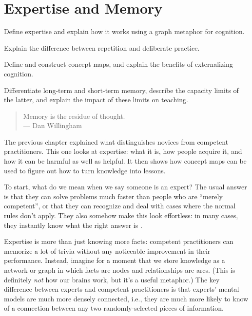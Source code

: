 \chapter{Expertise and Memory}\label{s:memory}

\begin{objectives}

\item Define expertise and explain how it works using a graph metaphor
  for cognition.

\item Explain the difference between repetition and deliberate
  practice.

\item Define and construct concept maps, and explain the benefits of
  externalizing cognition.

\item Differentiate long-term and short-term memory, describe the
  capacity limits of the latter, and explain the impact of these
  limits on teaching.

\end{objectives}

\begin{quote}

  Memory is the residue of thought. \\
  --- Dan Willingham

\end{quote}

The previous chapter explained what distinguishes novices from
competent practitioners. This one looks at expertise: what it is, how
people acquire it, and how it can be harmful as well as helpful.  It
then shows how concept maps can be used to figure out how to turn
knowledge into lessons.

To start, what do we mean when we say someone is an expert? The usual
answer is that they can solve problems much faster than people who are
``merely competent'', or that they can recognize and deal with cases
where the normal rules don't apply. They also somehow make this look
effortless: in many cases, they instantly know what the right answer
is \cite{Parn2017}.

Expertise is more than just knowing more facts: competent
practitioners can memorize a lot of trivia without any noticeable
improvement in their performance. Instead, imagine for a moment that
we store knowledge as a network or graph in which facts are nodes and
relationships are arcs. (This is definitely \emph{not} how our brains
work, but it's a useful metaphor.) The key difference between experts
and competent practitioners is that experts' mental models are much
more densely connected, i.e., they are much more likely to know of a
connection between any two randomly-selected pieces of information.

